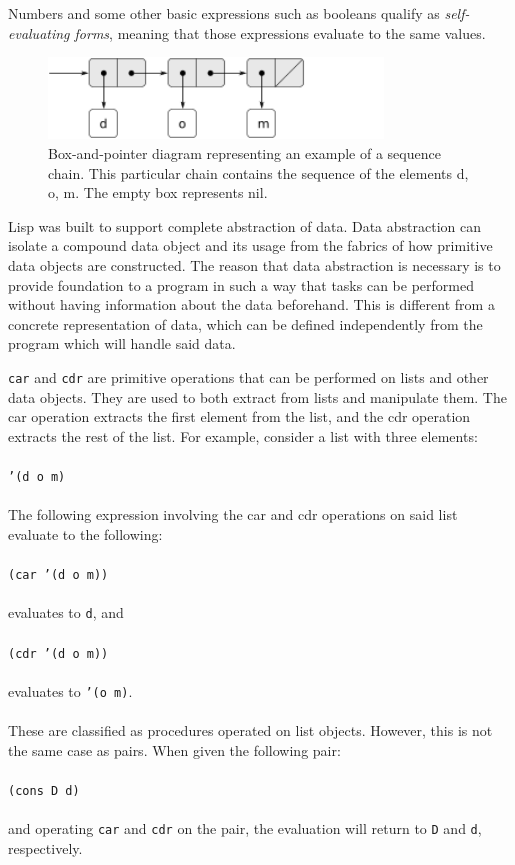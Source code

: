 \documentclass[journal]{IEEEtran}
\begin{document}
Numbers and some other basic expressions such as booleans qualify as \textit{self-evaluating forms}, meaning that those expressions evaluate to the same values.  

\begin{figure}
	\centering
	\includegraphics[width=3.5in]{Chain}
	\caption{Box-and-pointer diagram representing an example of a sequence chain. This particular chain contains the sequence of the elements d, o, m. The empty box represents nil.}
	\label{Data representation}
\end{figure}

Lisp was built to support complete abstraction of data. Data abstraction can isolate a compound data object and its usage from the fabrics of how primitive data objects are constructed. The reason that data abstraction is necessary is to provide foundation to a program in such a way that tasks can be performed without having information about the data beforehand. This is different from a concrete representation of data, which can be defined independently from the program which will handle said data.

\texttt{car} and \texttt{cdr} are primitive operations that can be performed on lists and other data objects. They are used to both extract from lists and manipulate them.  The car operation extracts the first element from the list, and the cdr operation extracts the rest of the list. For example, consider a list with three elements: \\\\\texttt{'(d o m)}\\\\ The following expression involving the car and cdr operations on said list evaluate to the following: \\\\\texttt{(car  '(d o m))}\\\\ evaluates to \texttt{d}, and \\\\\texttt{(cdr '(d o m))}\\\\ evaluates to \texttt{'(o m)}.\\\\ These are classified as procedures operated on list objects. However, this is not the same case as pairs. When given the following pair: \\\\\texttt{(cons D d)}\\\\ and operating \texttt{car} and \texttt{cdr} on the pair, the evaluation will return to \texttt{D} and \texttt{d}, respectively.
\end{document}

